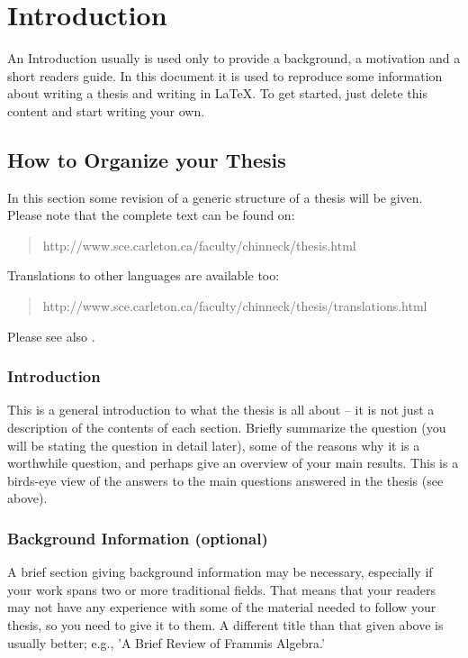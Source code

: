 \chapter{Introduction}\label{introduction}



An Introduction usually is used only to provide a background, a motivation and a short readers guide. In this document it is used to reproduce some information about writing a thesis and writing in \LaTeX. To get started, just delete this content and start writing your own.

\section{How to Organize your Thesis}
In this section some revision of a generic structure of a thesis will be given. Please note that the complete text can be found on:
\begin{quote}
	http://www.sce.carleton.ca/faculty/chinneck/thesis.html
\end{quote}
Translations to other languages are available too:
\begin{quote}
	http://www.sce.carleton.ca/faculty/chinneck/thesis/translations.html
\end{quote}
Please see also \cite{Leunen:Scholars:1992,Zuber-Skerritt:ThesisWriting:1986}.

\subsection{Introduction}

This is a general introduction to what the thesis is all about -- it is not just a description of the contents of each section. Briefly summarize the question (you will be stating the question in detail later), some of the reasons why it is a worthwhile question, and perhaps give an overview of your main results. This is a birds-eye view of the answers to the main questions answered in the thesis (see above).

\subsection{Background Information (optional)}

A brief section giving background information may be necessary, especially if your work spans two or more traditional fields. That means that your readers may not have any experience with some of the material needed to follow your thesis, so you need to give it to them. A different title than that given above is usually better; e.g., 'A Brief Review of Frammis Algebra.'

